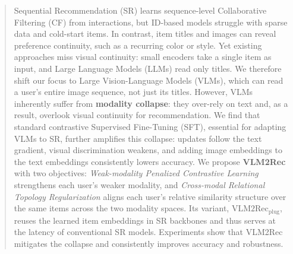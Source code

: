\begin{abstract}
\label{abstract}
Sequential Recommendation (SR) learns sequence-level Collaborative Filtering (CF) from interactions, but ID-based models struggle with sparse data and cold-start items.
In contrast, item titles and images can reveal preference continuity, such as a recurring color or style.
Yet existing approaches miss visual continuity: small encoders take a single item as input, and Large Language Models (LLMs) read only titles.
We therefore shift our focus to Large Vision-Language Models (VLMs), which can read a user's entire image sequence, not just its titles.
However, VLMs inherently suffer from \textbf{modality collapse}: they over-rely on text and, as a result, overlook visual continuity for recommendation.
We find that standard contrastive Supervised Fine-Tuning (SFT), essential for adapting VLMs to SR, further amplifies this collapse: updates follow the text gradient, visual discrimination weakens, and adding image embeddings to the text embeddings consistently lowers accuracy.
We propose \textbf{VLM2Rec} with two objectives: \textit{Weak-modality Penalized Contrastive Learning} strengthens each user's weaker modality, and \textit{Cross-modal Relational Topology Regularization} aligns each user's relative similarity structure over the same items across the two modality spaces.
Its variant, $\text{VLM2Rec}_{\text{plug}}$, reuses the learned item embeddings in SR backbones and thus serves at the latency of conventional SR models.
Experiments show that VLM2Rec mitigates the collapse and consistently improves accuracy and robustness.
\end{abstract}
